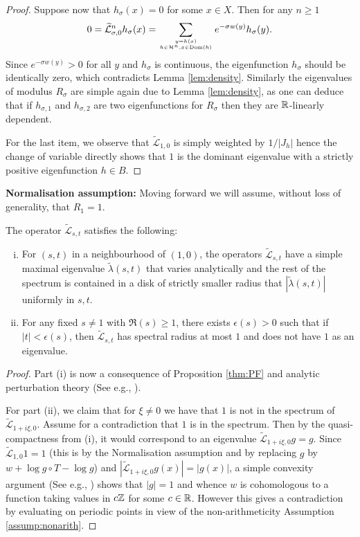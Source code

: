 \documentclass[12pt,a4paper,reqno]{amsart}
\begin{document}
\begin{proof}
Suppose now that $h_\sigma(x)=0$ for some $x \in X$. Then for any $n \geq 1$
\[ 0=\widetilde{\mathcal L}_{\sigma,0} ^n h_\sigma(x)= \sum_{y=h(x) \atop h \in \mathcal{H}^n, x \in \mathrm{Dom}(h)} e^{-\sigma w(y)} h_\sigma(y) . \]
Since $e^{-\sigma w(y)}>0$ for all $y$ and $h_\sigma$ is continuous, the eigenfunction $h_\sigma$ should be identically zero, which contradicts Lemma \ref{lem:density}. Similarly the eigenvalues of modulus $R_{\sigma}$ are simple again due to Lemma \ref{lem:density}, as one can deduce that if $h_{\sigma,1}$ and $h_{\sigma,2}$ are two eigenfunctions for $R_\sigma$ then they are ${\mathbb R}$-linearly dependent.

For the last item, we observe that $\widetilde{\mathcal L}_{1,0}$ is simply weighted by $1/|J_h|$ hence the change of variable directly shows that $1$ is the dominant eigenvalue with a strictly positive eigenfunction $h \in B$.
\end{proof}

\textbf{Normalisation assumption:} Moving forward we will assume, without loss of generality, that  $R_1 = 1$. 


\begin{lemma}\label{lem.spectrum}
The operator $\widetilde{\mathcal{L}}_{s,t}$ satisfies the following: 
\begin{enumerate}[(i)]
\item
For $(s,t)$ in a neighbourhood of $(1,0)$, the operators $\widetilde{\mathcal{L}}_{s,t}$ have a simple maximal eigenvalue $\widetilde{\lambda}(s,t)$
 that varies analytically and the rest of the spectrum is contained in a disk of strictly smaller radius that $|\widetilde{\lambda}(s,t)|$ uniformly in $s,t$.
\item
For any fixed $s \neq 1 $ with $\mathfrak{R}(s) \ge 1$, there exists $\epsilon(s)>0$ such that if $|t|< \epsilon(s)$, then $\widetilde{\mathcal{L}}_{s,t}$ has spectral radius at most $1$ and does not have $1$ as an eigenvalue. 
\end{enumerate}
\end{lemma}

\begin{proof}
Part (i)  is now a consequence of Proposition \ref{thm:PF} and analytic perturbation theory (See e.g., \cite{kato}).

For part (ii), we claim that for $\xi \neq 0$ we have that $1$ is not in the spectrum of $\widetilde{\mathcal L}_{1+i\xi,0}$.  Assume for a contradiction that $1$ is in the spectrum.  Then by the quasi-compactness from (i), it would correspond to an eigenvalue $\widetilde{\mathcal L}_{1+i\xi,0} g = g$.  Since $\widetilde{\mathcal L}_{1,0} 1 = 1$ (this is by the Normalisation assumption and by replacing $g$ by $w+\log g \circ T -\log g$) and $|\widetilde{\mathcal L}_{1+i\xi,0} g(x)| = |g(x)|$, a simple convexity argument  (See e.g., \cite[Chapter 4]{ParryPollicott}) shows that $|g|=1$ and whence $w$ is cohomologous to a function taking values in $c{\mathbb Z}$ for some $c \in {\mathbb R}$. However this gives a contradiction by evaluating on periodic points in view of the non-arithmeticity  Assumption  \ref{assump:nonarith}. 
\end{proof}
\end{document}
